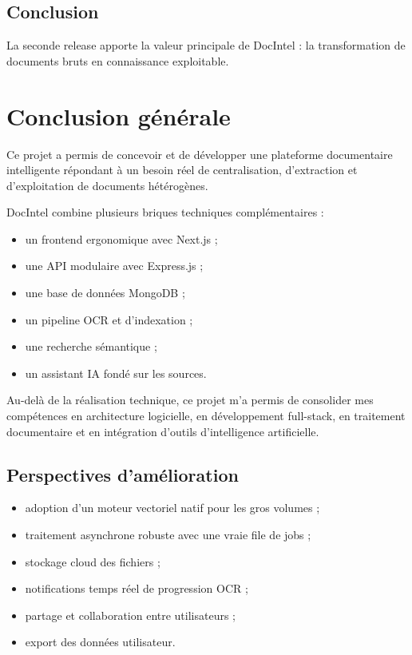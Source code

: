 \documentclass[12pt,a4paper]{report}
\begin{document}
\section{Conclusion}
La seconde release apporte la valeur principale de DocIntel : la transformation de documents bruts en connaissance exploitable.

\chapter{Conclusion g\'en\'erale}
Ce projet a permis de concevoir et de développer une plateforme documentaire intelligente répondant à un besoin réel de centralisation, d'extraction et d'exploitation de documents hétérogènes.

DocIntel combine plusieurs briques techniques complémentaires :
\begin{itemize}
  \item un frontend ergonomique avec Next.js ;
  \item une API modulaire avec Express.js ;
  \item une base de données MongoDB ;
  \item un pipeline OCR et d'indexation ;
  \item une recherche sémantique ;
  \item un assistant IA fondé sur les sources.
\end{itemize}

Au-delà de la réalisation technique, ce projet m'a permis de consolider mes compétences en architecture logicielle, en développement full-stack, en traitement documentaire et en intégration d'outils d'intelligence artificielle.

\section*{Perspectives d'amélioration}
\begin{itemize}
  \item adoption d'un moteur vectoriel natif pour les gros volumes ;
  \item traitement asynchrone robuste avec une vraie file de jobs ;
  \item stockage cloud des fichiers ;
  \item notifications temps réel de progression OCR ;
  \item partage et collaboration entre utilisateurs ;
  \item export des données utilisateur.
\end{itemize}
\end{document}
